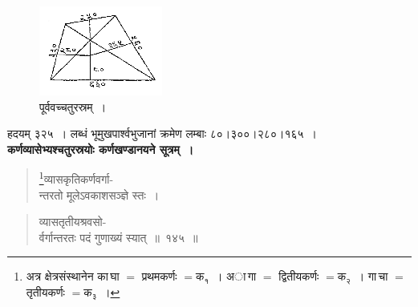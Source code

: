 \documentclass[11pt, openany]{book}
\begin{document}
\begin{figure}[h!]
    \centering
     \captionsetup{labelformat=empty}
    \caption{पूर्ववच्चतुरस्रम्~।}
\vspace{-2mm}
    \includegraphics[scale=0.85]{graphics/capture184.png}
\end{figure}
\vspace{-2mm}

हदयम् ३२५~। लब्धं भूमुखपार्श्वभुजानां क्रमेण लम्बाः ८०।३००।२८०।१६५~। \\

\textbf{कर्णव्यासेभ्यश्चतुरस्रयोः कर्णखण्डानयने सूत्रम्~।} 

\begin{quote}
    \bs 
    \footnote{अत्र क्षेत्रसंस्थानेन का\,घा $=$ प्रथमकर्णः $= \mbox{क}_{\text{१}}$~। अा\,गा $=$ द्वितीयकर्णः $= \mbox{क}_{\text{२}}$~। गा\,चा $=$ तृतीयकर्णः $= \mbox{क}_{\text{३}}$~।}व्यासकृतिकर्णवर्गा-\\
न्तरतो मूलेऽवकाशसञ्ज्ञे स्तः~। 
\end{quote}
\newpage%
\setcounter{footnote}{0}
\begin{quote}
    \bs 
    व्यासतृतीयश्रवसो-\\
र्वर्गान्तरतः पदं गुणाख्यं स्यात्~॥~१४५~॥
\end{quote}
\end{document}
